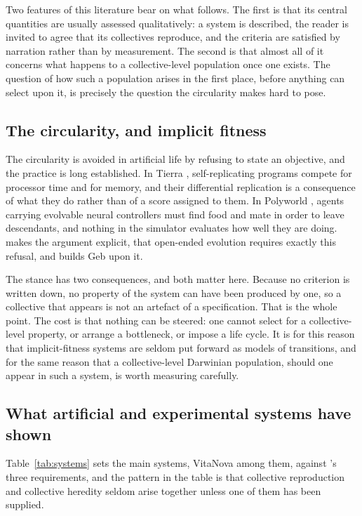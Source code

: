 \documentclass{artificial-life}
\begin{document}
Two features of this literature bear on what follows. The first is that its
central quantities are usually assessed qualitatively: a system is described,
the reader is invited to agree that its collectives reproduce, and the criteria
are satisfied by narration rather than by measurement. The second is that
almost all of it concerns what happens to a collective-level population once one
exists. The question of how such a population arises in the first place, before
anything can select upon it, is precisely the question the circularity makes
hard to pose.

\subsection{The circularity, and implicit fitness}

The circularity is avoided in artificial life by refusing to state an objective,
and the practice is long established. In Tierra \citep{ray1991approach},
self-replicating programs compete for processor time and for memory, and their
differential replication is a consequence of what they do rather than of a score
assigned to them. In Polyworld \citep{yaeger1994polyworld}, agents carrying
evolvable neural controllers must find food and mate in order to leave
descendants, and nothing in the simulator evaluates how well they are doing.
\citet{channon2001geb} makes the argument explicit, that open-ended evolution
requires exactly this refusal, and builds Geb upon it.

The stance has two consequences, and both matter here. Because no criterion is
written down, no property of the system can have been produced by one, so a
collective that appears is not an artefact of a specification. That is the
whole point. The cost is that nothing can be steered: one cannot select for a
collective-level property, or arrange a bottleneck, or impose a life cycle. It
is for this reason that implicit-fitness systems are seldom put forward as
models of transitions, and for the same reason that a collective-level Darwinian
population, should one appear in such a system, is worth measuring carefully.

\subsection{What artificial and experimental systems have shown}

Table~\ref{tab:systems} sets the main systems, VitaNova among them, against
\citet{godfreysmith2009}'s three requirements, and the pattern in the table is
that collective reproduction and collective heredity seldom arise together
unless one of them has been supplied.
\end{document}
